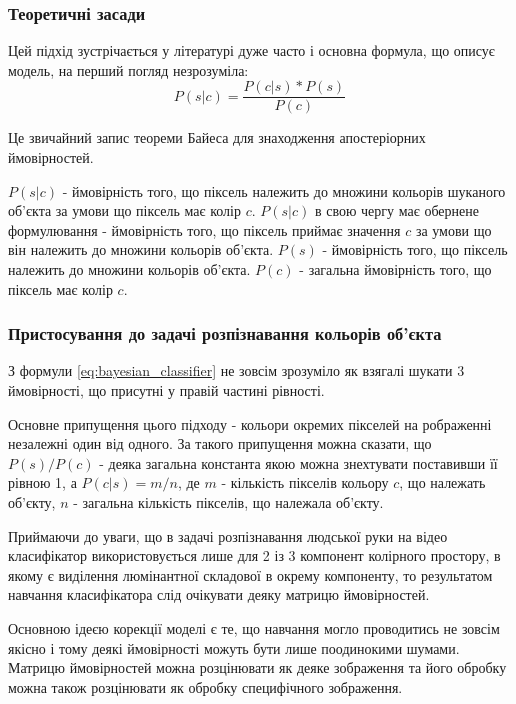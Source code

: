 \subsubsection{Теоретичні засади}

Цей підхід зустрічається у літературі дуже часто і основна формула, що описує модель, на перший погляд незрозуміла:
\begin{equation}
\label{eq:bayesian_classifier}
P(s|c) = \frac{P(c|s) * P(s)}{P(c)}
\end{equation}

Це звичайний запис теореми Байеса для знаходження апостеріорних ймовірностей.

$P(s|c)$ - ймовірність того, що піксель належить до множини кольорів шуканого об'єкта за умови що піксель має колір $c$. $P(s|c)$ в свою чергу має обернене формулювання - ймовірність того, що піксель приймає значення $c$ за умови що він належить до множини кольорів об'єкта.
$P(s)$ - ймовірність того, що піксель належить до множини кольорів об'єкта. $P(c)$ - загальна ймовірність того, що піксель має колір $c$.

\subsubsection{Пристосування до задачі розпізнавання кольорів об'єкта}

З формули \ref{eq:bayesian_classifier} не зовсім зрозуміло як взягалі шукати 3 ймовірності, що присутні у правій частині рівності.

Основне припущення цього підходу - кольори окремих пікселей на рображенні незалежні один від одного. За такого припущення можна сказати, що $P(s)/P(c)$ - деяка загальна константа якою можна знехтувати поставивши її рівною 1, а $P(c|s) = m/n$, де $m$ - кількість пікселів кольору $c$, що належать об'єкту, $n$ - загальна кількість пікселів, що належала об'єкту.

Приймаючи до уваги, що в задачі розпізнавання людської руки на відео класифікатор використовується лише для 2 із 3 компонент колірного простору, в якому є виділення люмінантної складової в окрему компоненту, то результатом навчання класифікатора слід очікувати деяку матрицю ймовірностей.

Основною ідеєю корекції моделі є те, що навчання могло проводитись не зовсім якісно і тому деякі ймовірності можуть бути лише поодинокими шумами. Матрицю ймовірностей можна розцінювати як деяке зображення та його обробку можна також розцінювати як обробку специфічного зображення.

